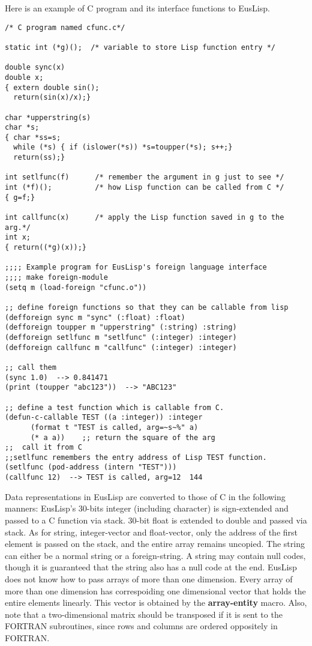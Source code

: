 Here is an example of C program and its interface functions to EusLisp.
\begin{verbatim}
/* C program named cfunc.c*/

static int (*g)();	/* variable to store Lisp function entry */

double sync(x)
double x;
{ extern double sin();
  return(sin(x)/x);}

char *upperstring(s)
char *s;
{ char *ss=s;
  while (*s) { if (islower(*s)) *s=toupper(*s); s++;}
  return(ss);}

int setlfunc(f)      /* remember the argument in g just to see */
int (*f)();          /* how Lisp function can be called from C */
{ g=f;}

int callfunc(x)      /* apply the Lisp function saved in g to the arg.*/
int x;
{ return((*g)(x));}

;;;; Example program for EusLisp's foreign language interface
;;;; make foreign-module
(setq m (load-foreign "cfunc.o"))

;; define foreign functions so that they can be callable from lisp
(defforeign sync m "sync" (:float) :float)
(defforeign toupper m "upperstring" (:string) :string)
(defforeign setlfunc m "setlfunc" (:integer) :integer)
(defforeign callfunc m "callfunc" (:integer) :integer)

;; call them
(sync 1.0)	--> 0.841471
(print (toupper "abc123"))  --> "ABC123"

;; define a test function which is callable from C.
(defun-c-callable TEST ((a :integer)) :integer
      (format t "TEST is called, arg=~s~%" a)
      (* a a))    ;; return the square of the arg
;;  call it from C
;;setlfunc remembers the entry address of Lisp TEST function.
(setlfunc (pod-address (intern "TEST")))
(callfunc 12)  --> TEST is called, arg=12  144
\end{verbatim}
  
Data representations in EusLisp are converted to those of C in the following
manners:
EusLisp's 30-bits integer (including character)
is sign-extended and passed to a C function via stack.
30-bit float is extended to double and passed via stack.
As for string, integer-vector and float-vector,
only the address of the first element is passed on the stack,
and the entire array remains uncopied.
The string can either be a normal string or a foreign-string.
A string may contain null codes, though it is guaranteed
that the string also has a null code at the end.
EusLisp does not know how to pass arrays of more than one dimension.
Every array of more than one dimension has correspoiding one dimensional
vector that holds the entire elements linearly.
This vector is obtained by the {\bf array-entity} macro.
Also, note that a two-dimensional matrix should be transposed
if it is sent to the FORTRAN subroutines, since rows and columns
are ordered oppositely in FORTRAN.

